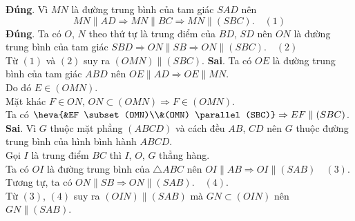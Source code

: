 \begin{ex}
{\begin{center}
  \end{center}
  \begin{itemchoice}
   \itemch \textbf{Đúng}. Vì $MN$ là đường trung bình của tam giác $SAD$ nên $$MN \parallel AD \Rightarrow MN \parallel  BC \Rightarrow MN \parallel(SBC).\quad(1)$$
   \itemch \textbf{Đúng}. Ta có $O$, $N$ theo thứ tự là trung điểm của $BD$, $SD$ nên $ON$ là đường trung bình của  tam giác $SBD \Rightarrow ON \parallel SB \Rightarrow ON \parallel(SBC). \quad(2)$\\ Từ $(1)$ và $(2)$ suy ra $(OMN) \parallel(SBC)$.
   \itemch \textbf{Sai}. Ta có $OE$ là đường trung bình của tam giác  $ABD$ nên $OE \parallel AD \Rightarrow OE \parallel MN$.\\
   Do đó $E  \in(OMN)$.\\
   Mặt khác $F \in ON,\, ON  \subset(OMN) \Rightarrow F \in(OMN)$.\\
   Ta có $\heva{&EF \subset(OMN)\\&(OMN) \parallel(SBC)} \Rightarrow EF \parallel(SBC)$. 
    \itemch \textbf{Sai}.
   Vì $G$ thuộc mặt phẳng $(ABCD)$ và  cách đều $AB$, $CD$ nên $G$ thuộc đường trung bình của hình bình hành $ABCD$.\\
   Gọi  $I$ là trung điểm $BC$ thì $I$, $O$, $G$ thẳng hàng.\\
   Ta có $OI$  là đường trung bình của $\triangle ABC$ nên $OI \parallel AB \Rightarrow OI \parallel(SAB)\quad(3)$.\\
   Tương tự, ta có $ON \parallel SB  \Rightarrow ON \parallel(SAB). \quad(4)$.\\
   Từ $(3)$, $(4)$ suy ra $(OIN) \parallel(SAB)$ mà $GN \subset(OIN)$ nên $GN  \parallel(SAB)$.
 \end{itemchoice}}
\end{ex}

